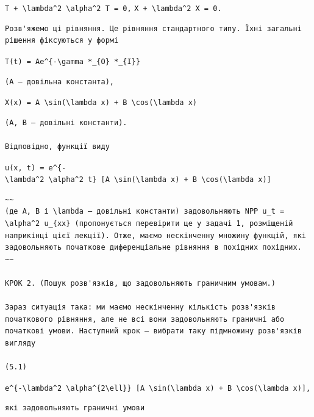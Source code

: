 \documentclass[
  ukrainian,
]{article}
\begin{document}
\texttt{T\textquotesingle{}\ +\ \textbackslash{}lambda\^{}2\ \textbackslash{}alpha\^{}2\ T\ =\ 0,}
\texttt{X\textquotesingle{}\textquotesingle{}\ +\ \textbackslash{}lambda\^{}2\ X\ =\ 0.}

\begin{verbatim}
Розв'яжемо ці рівняння. Це рівняння стандартного типу. Їхні загальні рішення фіксуються у формі
\end{verbatim}

\texttt{T(t)\ =\ Ae\^{}\{-\textbackslash{}gamma\ *\_\{O\}\ *\_\{I\}\}}

\begin{verbatim}
(A — довільна константа),
\end{verbatim}

\texttt{X(x)\ =\ A\ \textbackslash{}sin(\textbackslash{}lambda\ x)\ +\ B\ \textbackslash{}cos(\textbackslash{}lambda\ x)}

\begin{verbatim}
(A, B — довільні константи).

Відповідно, функції виду
\end{verbatim}

\texttt{u(x,\ t)\ =\ e\^{}\{-\textbackslash{}lambda\^{}2\ \textbackslash{}alpha\^{}2\ t\}\ {[}A\ \textbackslash{}sin(\textbackslash{}lambda\ x)\ +\ B\ \textbackslash{}cos(\textbackslash{}lambda\ x){]}}

\begin{verbatim}
~~
(де A, B і \lambda — довільні константи) задовольняють NPP u_t = \alpha^2 u_{xx} (пропонується перевірити це у задачі 1, розміщеній наприкінці цієї лекції). Отже, маємо нескінченну множину функцій, які задовольняють початкове диференціальне рівняння в похідних похідних.
~~

КРОК 2. (Пошук розв'язків, що задовольняють граничним умовам.)

Зараз ситуація така: ми маємо нескінченну кількість розв'язків початкового рівняння, але не всі вони задовольняють граничні або початкові умови. Наступний крок — вибрати таку підмножину розв'язків вигляду

(5.1)
\end{verbatim}

\texttt{e\^{}\{-\textbackslash{}lambda\^{}2\ \textbackslash{}alpha\^{}\{2\textbackslash{}ell\}\}\ {[}A\ \textbackslash{}sin(\textbackslash{}lambda\ x)\ +\ B\ \textbackslash{}cos(\textbackslash{}lambda\ x){]},}

\begin{verbatim}
які задовольняють граничні умови
\end{verbatim}
\end{document}
